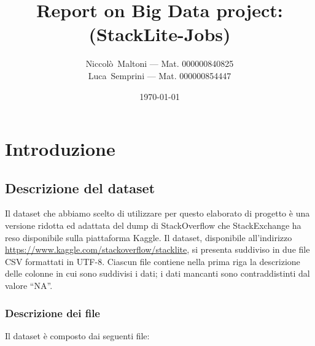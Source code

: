 \documentclass[
  a4paper,            %
  10pt                %
]{article}
\title{\textbf{Report on Big Data project: \\(StackLite-Jobs)}}
\author{
  Niccolò~Maltoni --- Mat. 000000840825\\%
  Luca~Semprini --- Mat. 000000854447
}
\date{\today}
\begin{document}
  \maketitle
  \newpage

  \tableofcontents

  \newpage

  \section{Introduzione}\label{sec:intro}
  \subsection{Descrizione del dataset}\label{subsec:dataset}

  Il dataset che abbiamo scelto di utilizzare per questo elaborato di progetto è una versione ridotta ed adattata del dump di StackOverflow che StackExchange ha reso disponibile sulla piattaforma Kaggle.
  Il dataset, disponibile all'indirizzo \url{https://www.kaggle.com/stackoverflow/stacklite}, si presenta suddiviso in due file CSV formattati in UTF-8.
  Ciascun file contiene nella prima riga la descrizione delle colonne in cui sono suddivisi i dati;
  i dati mancanti sono contraddistinti dal valore ``NA''.

  \subsubsection{Descrizione dei file}\label{subsub:dataset:files}

  Il dataset è composto dai seguenti file:
\end{document}
